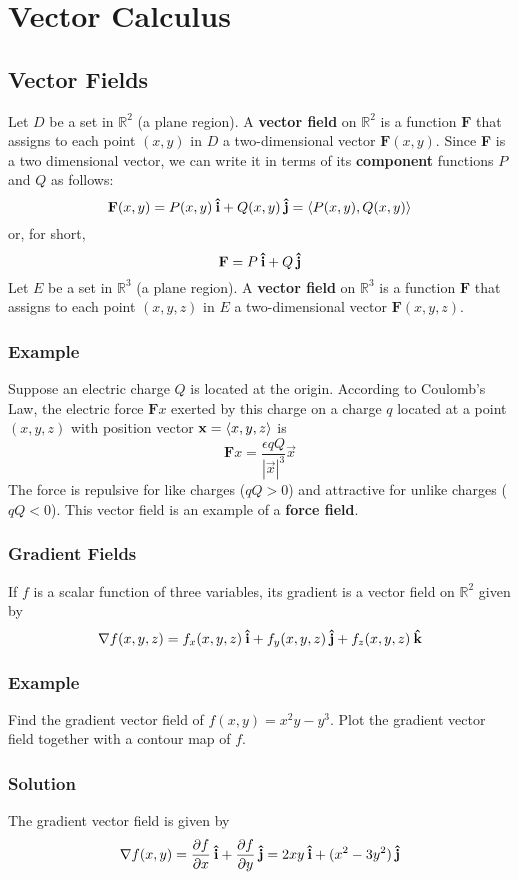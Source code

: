 \setcounter{chapter}{16}
\chapter{Vector Calculus}

\section{Vector Fields}
Let $D$ be a set in $\mathbb{R}^2$ (a plane region). A \textbf{vector field} on $\mathbb{R}^2$ is a function $\textbf{F}$ that assigns to each point $(x,y)$
in $D$ a two-dimensional vector $\textbf{F}(x,y)$. Since \textbf{F} is a two dimensional vector, we can write it in terms of its \textbf{component} functions $P$ and $Q$ as follows:
$$\textbf{F}(x,y) = P(x,y)\ihat + Q(x,y)\jhat = \ev{P(x,y), Q(x, y)}$$or, for short, $$\textbf{F} = P\:\boldsymbol{\hat{\textbf{i}}} + Q\:\boldsymbol{\hat{\textbf{j}}}$$
Let $E$ be a set in $\mathbb{R}^3$ (a plane region). A \textbf{vector field} on $\mathbb{R}^3$ is a function $\textbf{F}$ that assigns to each point $(x,y,z)$
in $E$ a two-dimensional vector $\textbf{F}(x,y,z)$. 

\subsection*{Example}
Suppose an electric charge $Q$ is located at the origin. According to Coulomb's Law, the electric force $\textbf{F}x$ exerted by this charge on a charge $q$ located at a point
$(x,y,z)$ with position vector $\textbf{x} = \ev{x,y,z}$ is $$\textbf{F}x = \frac{\epsilon qQ}{|\vec{x}|^3}\vec{x}$$
The force is repulsive for like charges ($qQ > 0$) and attractive for unlike charges ($qQ < 0$). This vector field is an example of a \textbf{force field}.

\subsection*{Gradient Fields}
If $f$ is a scalar function of three variables, its gradient is a vector field on $\mathbb{R}^2$ given by 
$$\nabla f(x,y,z) = f_x(x,y,z)\:\boldsymbol{\hat{\textbf{i}}} + f_y(x,y,z)\:\boldsymbol{\hat{\textbf{j}}} + f_z(x,y,z)\:\boldsymbol{\hat{\textbf{k}}}$$

\subsection*{Example}
Find the gradient vector field of $f(x,y) = x^2y - y^3$. Plot the gradient vector field together with a contour map of $f$.
\subsection*{Solution}
The gradient vector field is given by $$\nabla f(x,y) = \frac{\partial f}{\partial x}\:\boldsymbol{\hat{\textbf{i}}} + \frac{\partial f}{\partial y}\:\boldsymbol{\hat{\textbf{j}}} = 2xy\:\boldsymbol{\hat{\textbf{i}}} + (x^2 - 3y^2)\:\boldsymbol{\hat{\textbf{j}}}$$

